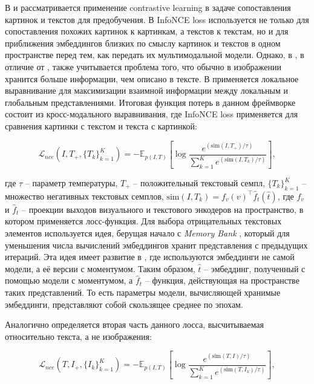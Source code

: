 \documentclass[a4paper, 14pt]{article}
\begin{document}
В \citep{ALBEF} и \citep{TCL} рассматривается применение contrastive learning в задаче сопоставления картинок и текстов для предобучения. В \citep{ALBEF} InfoNCE loss используется не только для сопоставления похожих картинок к картинкам, а текстов к текстам, но и для приближения эмбеддингов близких по смыслу картинок и текстов в одном пространстве перед тем, как передать их мультимодальной модели. Однако, в \citep{TCL}, в отличие от \citep{ALBEF}, также учитывается проблема того, что обычно в изображении хранится больше информации, чем описано в тексте. В \citep{TCL} применяется локальное выравнивание для максимизации взаимной информации между локальным и глобальным представлениями. Итоговая функция потерь в данном фреймворке состоит из кросс-модального выравнивания, где InfoNCE loss применяется для сравнения картинки с текстом и текста с картинкой:

\begin{equation}
    \mathcal{L}_{nce}(I, T_+, \{T_k\}_{k=1}^K) = - \mathbb{E}_{p(I, T)}\left[\log\frac{e^{(\text{sim}(I, T_+)/\tau)}}{\sum_{k=1}^Ke^{(\text{sim}(I, T_k)/\tau)}}\right],
\end{equation}

\noindent где $\tau$ -- параметр температуры, $T_+$ -- положительный текстовый семпл, $\{T_k\}_{k=1}^K$ -- множество негативных текстовых семплов, $\text{sim}(I, T_k) = f_v(v)^\top \hat{f}_t(\hat{t})$, где $f_v$ и $\hat{f}_t$ -- проекции выходов визуального и текстового энкодеров на пространство, в котором применяется лосс-функция. Для выбора отрицательных текстовых элементов используется идея, берущая начало с \textit{Memory Bank} \citep{MemoryBank}, который для уменьшения числа вычислений эмбеддингов хранит представления с предыдущих итераций. Эта идея имеет развитие в \citep{he2019moco}, где используются эмбеддинги не самой модели, а её версии с моментумом. Таким образом, $\hat{t}$ -- эмбеддинг, полученный с помощью модели с моментумом, а $\hat{f}_t$ -- функция, действующая на пространстве таких представлений. То есть параметры модели, вычисляющей хранимые эмбеддинги, представляют собой скользящее среднее по эпохам.

Аналогично определяется вторая часть данного лосса, высчитываемая относительно текста, а не изображения:

\begin{equation}
    \mathcal{L}_{nce}(T, I_+, \{I_k\}_{k=1}^K) = - \mathbb{E}_{p(I, T)}\left[\log\frac{e^{(\text{sim}(T, I)/\tau)}}{\sum_{k=1}^Ke^{(\text{sim}(T, I_k)/\tau)}}\right],
\end{equation}
\end{document}
